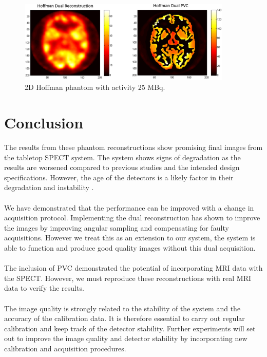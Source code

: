 \begin{figure}[!t]
\centering
\includegraphics[width=4in]{figures/Hoffman.png}

\caption{2D Hoffman phantom with activity 25 MBq.}
\label{fig:Hoffman}
\end{figure}

\section{Conclusion}
The results from these phantom reconstructions show promising final images from the tabletop \acrshort{SPECT} system. The system shows signs of degradation as the results are worsened compared to previous studies and the intended design specifications. However, the age of the detectors is a likely factor in their degradation and instability \cite{Carminati2019ClinicalCharacterization}. 
\paragraph{}
We have demonstrated that the performance can be improved with a change in acquisition protocol. Implementing the dual reconstruction has shown to improve the images by improving angular sampling and compensating for faulty acquisitions. However we treat this as an extension to our system, the system is able to function and produce good quality images without this dual acquisition.
\paragraph{}
The inclusion of \acrshort{PVC} demonstrated the potential of incorporating \acrshort{MRI} data with the \acrshort{SPECT}. However, we must reproduce these reconstructions with real \acrshort{MRI} data to verify the results. 
\paragraph{}
The image quality is strongly related to the stability of the system and the accuracy of the calibration data. It is therefore essential to carry out regular calibration and keep track of the detector stability. Further experiments will set out to improve the image quality and detector stability by incorporating new calibration and acquisition procedures. 

